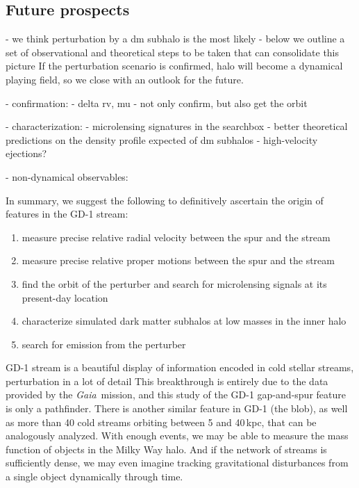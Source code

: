 \documentclass[twocolumn]{aastex62}
\newcommand{\gaia}{\textsl{Gaia}}
\begin{document}
\subsection{Future prospects}
\label{sec:future}
- we think perturbation by a dm subhalo is the most likely
- below we outline a set of observational and theoretical steps to be taken that can consolidate this picture
If the perturbation scenario is confirmed, halo will become a dynamical playing field, so we close with an outlook for the future.

- confirmation:
- delta rv, mu
- not only confirm, but also get the orbit

- characterization:
- microlensing signatures in the searchbox
- better theoretical predictions on the density profile expected of dm subhalos
- high-velocity ejections?

- non-dynamical observables:

In summary, we suggest the following to definitively ascertain the origin of features in the GD-1 stream:
\begin{enumerate}
 \item measure precise relative radial velocity between the spur and the stream
 \item measure precise relative proper motions between the spur and the stream
 \item find the orbit of the perturber and search for microlensing signals at its present-day location
 \item characterize simulated dark matter subhalos at low masses in the inner halo
 \item search for emission from the perturber
\end{enumerate}

GD-1 stream is a beautiful display of information encoded in cold stellar streams, perturbation in a lot of detail
This breakthrough is entirely due to the data provided by the \gaia\ mission, and this study of the GD-1 gap-and-spur feature is only a pathfinder.
There is another similar feature in GD-1 (the blob), as well as more than 40 cold streams orbiting between 5 and 40\,kpc, that can be analogously analyzed.
With enough events, we may be able to measure the mass function of objects in the Milky Way halo.
And if the network of streams is sufficiently dense, we may even imagine tracking gravitational disturbances from a single object dynamically through time.
\end{document}
